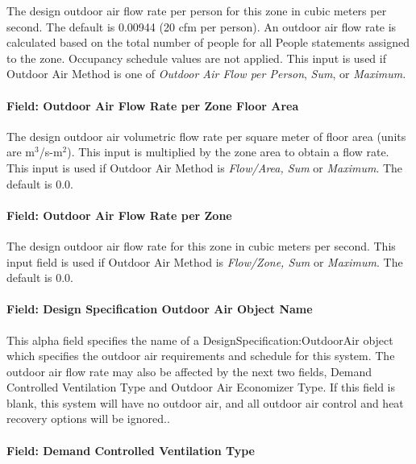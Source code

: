 The design outdoor air flow rate per person for this zone in cubic meters per second. The default is 0.00944 (20 cfm per person). An outdoor air flow rate is calculated based on the total number of people for all People statements assigned to the zone. Occupancy schedule values are not applied. This input is used if Outdoor Air Method is one of \emph{Outdoor Air Flow per Person}, \emph{Sum}, or \emph{Maximum.}

\paragraph{Field: Outdoor Air Flow Rate per Zone Floor Area}\label{field-outdoor-air-flow-rate-per-zone-floor-area}

The design outdoor air volumetric flow rate per square meter of floor area (units are m\(^{3}\)/s-m\(^{2}\)). This input is multiplied by the zone area to obtain a flow rate. This input is used if Outdoor Air Method is \emph{Flow/Area, Sum} or \emph{Maximum}. The default is 0.0.

\paragraph{Field: Outdoor Air Flow Rate per Zone}\label{field-outdoor-air-flow-rate-per-zone}

The design outdoor air flow rate for this zone in cubic meters per second. This input field is used if Outdoor Air Method is \emph{Flow/Zone, Sum} or \emph{Maximum}. The default is 0.0.

\paragraph{Field: Design Specification Outdoor Air Object Name}\label{field-design-specification-outdoor-air-object-name-001}

This alpha field specifies the name of a DesignSpecification:OutdoorAir object which specifies the outdoor air requirements and schedule for this system. The outdoor air flow rate may also be affected by the next two fields, Demand Controlled Ventilation Type and Outdoor Air Economizer Type. If this field is blank, this system will have no outdoor air, and all outdoor air control and heat recovery options will be ignored..

\paragraph{Field: Demand Controlled Ventilation Type}\label{field-demand-controlled-ventilation-type}

